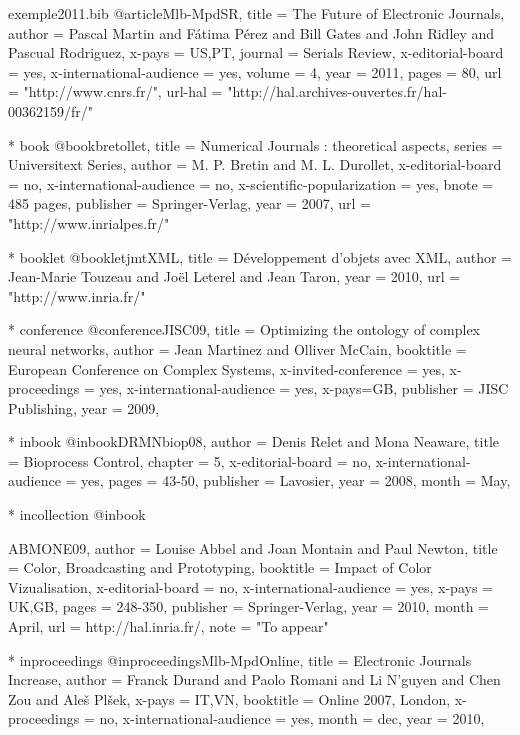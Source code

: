\documentclass{ra2011}
\begin{document}
\begin{filecontents+}{exemple2011.bib}
@article{Mlb-MpdSR,
title = {The Future of Electronic Journals},
author = {Pascal Martin and Fátima Pérez and Bill Gates and John Ridley and Pascual Rodriguez},
x-pays = {US,PT},
journal = {Serials Review}, 
x-editorial-board = {yes}, 
x-international-audience = {yes}, 
volume = 4, 
year = 2011, 
pages = 80, 
url =  "http://www.cnrs.fr/",
url-hal = "http://hal.archives-ouvertes.fr/hal-00362159/fr/"
} 


    * book
@book{bretollet,
title = {Numerical Journals : theoretical aspects}, 
series = {Universitext Series}, 
author = {M. P. Bretin and M. L. Durollet}, 
x-editorial-board = {no}, 
x-international-audience = {no}, 
x-scientific-popularization = {yes}, 
bnote = {485 pages}, 
publisher = {Springer-Verlag}, 
year = 2007, 
url = "http://www.inrialpes.fr/"
}


    * booklet
@booklet{jmtXML,
title = {Développement d'objets avec XML}, 
author = {Jean-Marie Touzeau and Joël Leterel and Jean Taron}, 
year = 2010, 
url =  "http://www.inria.fr/"
}
	
	
    * conference
@conference{JISC09,
title = {Optimizing the ontology of complex neural networks}, 
author = {Jean Martinez and Olliver McCain}, 
booktitle = {European Conference on Complex Systems}, 
x-invited-conference = {yes}, 
x-proceedings = {yes}, 
x-international-audience = {yes}, 
x-pays={GB},
publisher = {JISC Publishing}, 
year = 2009, 
}


    * inbook
@inbook{DRMNbiop08,
author = {Denis Relet and Mona Neaware}, 
title = {Bioprocess Control}, 
chapter = {5}, 
x-editorial-board = {no}, 
x-international-audience = {yes}, 
pages = {43-50}, 
publisher = {Lavosier}, 
year = 2008, 
month = {May}, 
}


	* incollection
@inbook{ABMONE09,
author = {Louise Abbel and Joan Montain and Paul Newton}, 
title = {Color, Broadcasting and Prototyping}, 
booktitle = {Impact of Color Vizualisation}, 
x-editorial-board = {no}, 
x-international-audience = {yes}, 
x-pays = {UK,GB},
pages = {248-350}, 
publisher = {Springer-Verlag}, 
year = 2010, 
month = {April},
url = {http://hal.inria.fr/}, 
note = "To appear"

}

 
	* inproceedings
@inproceedings{Mlb-MpdOnline,
title = {Electronic Journals Increase},
author = {Franck Durand and Paolo Romani and Li N'guyen and Chen Zou and Aleš Plšek},
x-pays = {IT,VN}, 
booktitle = {Online 2007, London}, 
x-proceedings = {no}, 
x-international-audience = {yes},
month = dec,
year = 2010,
}



\end{filecontents+}
\end{document}
